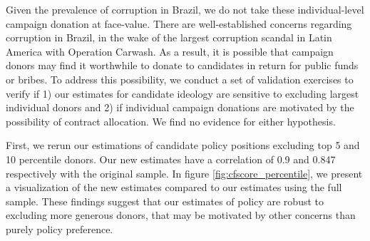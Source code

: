 \documentclass[12pt,english]{article}
\newcommand{\lyxdot}{.}
\numberwithin{equation}{section}
\theoremstyle{plain}
\theoremstyle{remark}
\theoremstyle{plain}
\newcommand{\red}[1]{\textcolor{red}{#1}}
\begin{document}

Given the prevalence of corruption in Brazil, we do not take these individual-level campaign donation at face-value. There are well-established concerns regarding corruption in Brazil, in the wake of the largest corruption scandal in Latin America with Operation Carwash. As a result, it is possible that campaign donors may find it worthwhile to donate to candidates in return for public funds or bribes. To address this possibility, we conduct a set of validation exercises to verify if 1) our estimates for candidate ideology are sensitive to excluding largest individual donors and 2) if individual campaign donations are motivated by the possibility of contract allocation. We find no evidence for either hypothesis.


First, we rerun our estimations of candidate policy positions excluding top 5 and 10 percentile donors. Our new estimates have a correlation of 0.9 and 0.847 respectively with the original sample. In figure \ref{fig:cfscore_percentile}, we present a visualization of the new estimates compared to our estimates using the full sample. These findings suggest that our estimates of policy are robust to excluding more generous donors, that may be motivated by other concerns than purely policy preference.
\end{document}

